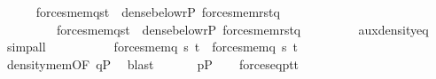 \begin{isabellebody}
\ \ \ \ \isamarkupfalse%
\ {\isachardoublequoteopen}forces{\isacharunderscore}{\kern0pt}mem{\isacharparenleft}{\kern0pt}q{\isacharcomma}{\kern0pt}s{\isacharcomma}{\kern0pt}t{}{\isacharparenright}{\kern0pt}\ {\isasymLongrightarrow}\ dense{\isacharunderscore}{\kern0pt}below{\isacharparenleft}{\kern0pt}{\isacharbraceleft}{\kern0pt}r{\isasymin}P{\isachardot}{\kern0pt}\ forces{\isacharunderscore}{\kern0pt}mem{\isacharparenleft}{\kern0pt}r{\isacharcomma}{\kern0pt}s{\isacharcomma}{\kern0pt}t{}{\isacharparenright}{\kern0pt}{\isacharbraceright}{\kern0pt}{\isacharcomma}{\kern0pt}q{\isacharparenright}{\kern0pt}{\isachardoublequoteclose}\isanewline
\ \ \ \ \ \ \ \ \ {\isachardoublequoteopen}forces{\isacharunderscore}{\kern0pt}mem{\isacharparenleft}{\kern0pt}q{\isacharcomma}{\kern0pt}s{\isacharcomma}{\kern0pt}t{}{\isacharparenright}{\kern0pt}\ {\isasymLongrightarrow}\ dense{\isacharunderscore}{\kern0pt}below{\isacharparenleft}{\kern0pt}{\isacharbraceleft}{\kern0pt}r{\isasymin}P{\isachardot}{\kern0pt}\ forces{\isacharunderscore}{\kern0pt}mem{\isacharparenleft}{\kern0pt}r{\isacharcomma}{\kern0pt}s{\isacharcomma}{\kern0pt}t{}{\isacharparenright}{\kern0pt}{\isacharbraceright}{\kern0pt}{\isacharcomma}{\kern0pt}q{\isacharparenright}{\kern0pt}{\isachardoublequoteclose}\ \isanewline
\ \ \ \ \ \ \isamarkupfalse%
\ aux{\isacharunderscore}{\kern0pt}density{\isacharunderscore}{\kern0pt}eq\ \isamarkupfalse%
\ simp{\isacharunderscore}{\kern0pt}all\isanewline
\ \ \ \ \isamarkupfalse%
\isanewline
\ \ \ \ \isamarkupfalse%
\ {\isachardoublequoteopen}forces{\isacharunderscore}{\kern0pt}mem{\isacharparenleft}{\kern0pt}q{\isacharcomma}{\kern0pt}\ s{\isacharcomma}{\kern0pt}\ t{}{\isacharparenright}{\kern0pt}\ {\isasymlongleftrightarrow}\ forces{\isacharunderscore}{\kern0pt}mem{\isacharparenleft}{\kern0pt}q{\isacharcomma}{\kern0pt}\ s{\isacharcomma}{\kern0pt}\ t{}{\isacharparenright}{\kern0pt}{\isachardoublequoteclose}\isanewline
\ \ \ \ \ \ \isamarkupfalse%
\ density{\isacharunderscore}{\kern0pt}mem{\isacharbrackleft}{\kern0pt}OF\ {\isacartoucheopen}q{\isasymin}P{\isacartoucheclose}{\isacharbrackright}{\kern0pt}\ \isamarkupfalse%
\ blast\isanewline
\ \ \isacommand{{\isacharbraceright}{\kern0pt}}\isamarkupfalse%
\isanewline
\ \ \isamarkupfalse%
\ {\isacartoucheopen}p{\isasymin}P{\isacartoucheclose}\isanewline
\ \ \isamarkupfalse%
\ {\isachardoublequoteopen}forces{\isacharunderscore}{\kern0pt}eq{\isacharparenleft}{\kern0pt}p{\isacharcomma}{\kern0pt}t{}{\isacharcomma}{\kern0pt}t{}{\isacharparenright}{\kern0pt}{\isachardoublequoteclose}\ \isamarkupfalse%

\end{isabellebody}
